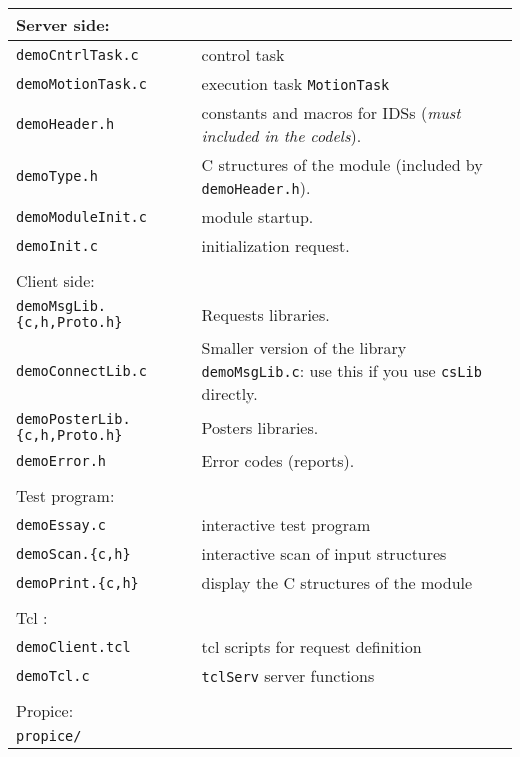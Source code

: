 \begin{center}\small
 \begin{tabularx}{\linewidth}{|l|X|}
 \hline
 \multicolumn{2}{|l|}{Server side: } \\
 \hline
 {\tt demoCntrlTask.c}& control task \\
 {\tt demoMotionTask.c}& execution task {\tt MotionTask}  \\
 {\tt demoHeader.h}&  constants and macros for IDSs ({\em must included
in the codels}). \\
 {\tt demoType.h}&  C structures of the module
 (included by {\tt demoHeader.h}). \\ 
 {\tt demoModuleInit.c}& module startup. \\
 {\tt demoInit.c}& initialization request.  \\
 \hline
 \multicolumn{2}{l}{} \\

 \hline
 \multicolumn{2}{|l|}{Client side: } \\
 \hline
 {\tt demoMsgLib.\{c,h,Proto.h\}}  &  Requests libraries. \\
 {\tt demoConnectLib.c}  &  Smaller version of the library {\tt
demoMsgLib.c}: use this if you use {\tt csLib} directly. \\
 {\tt demoPosterLib.\{c,h,Proto.h\}}  &  Posters libraries.\\
 {\tt demoError.h}  &  Error codes (reports).\\
 \hline
 \multicolumn{2}{l}{} \\

 \hline
 \multicolumn{2}{|l|}{Test program:} \\
 \hline
 {\tt demoEssay.c}  &  interactive test program\\
 {\tt demoScan.\{c,h\}}  &  interactive  scan of input structures\\
 {\tt demoPrint.\{c,h\}}  &  display the C structures of the module\\
 \hline
 \multicolumn{2}{l}{} \\

 \hline
 \multicolumn{2}{|l|}{Tcl :} \\
 \hline
 {\tt demoClient.tcl}  &  tcl scripts for request definition\\
 {\tt demoTcl.c}  &   {\tt tclServ} server functions\\
 \hline
 \multicolumn{2}{l}{} \\

 \hline
 \multicolumn{2}{|l|}{Propice:} \\
 \hline
 {\tt propice/}  & \\
 \hline
 \end{tabularx}
\end{center}

